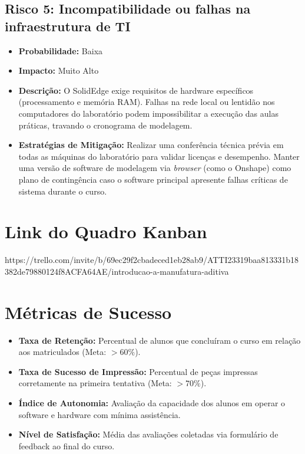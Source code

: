 \documentclass[12pt, a4paper]{article}
\begin{document}
\subsection{Risco 5: Incompatibilidade ou falhas na infraestrutura de TI}
\begin{itemize}
\item \textbf{Probabilidade:} Baixa
\item \textbf{Impacto:} Muito Alto
\item \textbf{Descrição:} O SolidEdge exige requisitos de hardware específicos (processamento e memória RAM). Falhas na rede local ou lentidão nos computadores do laboratório podem impossibilitar a execução das aulas práticas, travando o cronograma de modelagem.
\item \textbf{Estratégias de Mitigação:} Realizar uma conferência técnica prévia em todas as máquinas do laboratório para validar licenças e desempenho. Manter uma versão de software de modelagem via \textit{browser} (como o Onshape) como plano de contingência caso o software principal apresente falhas críticas de sistema durante o curso.
\end{itemize}

\section{Link do Quadro Kanban}
https://trello.com/invite/b/69ec29f2cbadeced1eb28ab9/ATTI23319baa813331b18382de79880124f8ACFA64AE/introducao-a-manufatura-aditiva

\section{Métricas de Sucesso}
\begin{itemize}
    \item \textbf{Taxa de Retenção:} Percentual de alunos que concluíram o curso em relação aos matriculados (Meta: $> 60\%$).
    \item \textbf{Taxa de Sucesso de Impressão:} Percentual de peças impressas corretamente na primeira tentativa (Meta: $> 70\%$).
    \item \textbf{Índice de Autonomia:} Avaliação da capacidade dos alunos em operar o software e hardware com mínima assistência.
    \item \textbf{Nível de Satisfação:} Média das avaliações coletadas via formulário de feedback ao final do curso.
\end{itemize}
\end{document}
